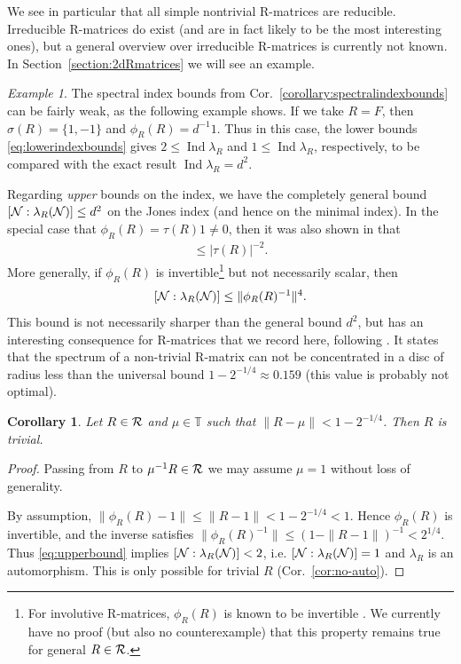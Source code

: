 \documentclass[12pt,a4paper]{amsart}
\numberwithin{equation}{section}
\newtheorem{corollary}[theorem]{Corollary}
\theoremstyle{remark}
\newtheorem{example}[theorem]{Example}
\def\Ind{\operatorname{Ind}}
\def\T{\mathbb{T}}
\newcommand{\la}{\lambda}
\begin{document}
We see in particular that all simple nontrivial R-matrices are reducible. Irreducible R-matrices do exist (and are in fact likely to be the most interesting ones), but a general overview over irreducible R-matrices is currently not known. In Section~\ref{section:2dRmatrices} we will see an example.


\begin{example}
    The spectral index bounds from Cor.~\ref{corollary:spectralindexbounds} can be fairly weak, as the following example shows. If we take $R=F$, then $\sigma(R)=\{1,-1\}$ and $\phi_R(R)=d^{-1}1$. Thus in this case, the lower bounds \eqref{eq:lowerindexbounds} gives $2\leq\Ind\la_R$ and $1\leq\Ind\la_R$, respectively, to be compared with the exact result $\Ind\la_R=d^2$.
\end{example}

Regarding {\em upper} bounds on the index, we have the completely general bound $[\CN:\la_R(\CN)]\leq d^2$ on the Jones index \cite{ContiPinzari:1996} (and hence on the minimal index). In the special case that $\phi_R(R)=\tau(R)1\neq0$, then it was also shown in \cite{ContiPinzari:1996} that
\begin{align}
	[\CN:\la_R(\CN)]\leq |\tau(R)|^{-2}.	
\end{align}
More generally, if $\phi_R(R)$ is invertible\footnote{For involutive R-matrices, $\phi_R(R)$ is known to be invertible \cite{LechnerPennigWood:2019}. We currently have no proof (but also no counterexample) that this property remains true for general $R\in\mathcal{R}$.} but not necessarily scalar, then
\begin{align}\label{eq:upperbound}
    [\CN:\la_R(\CN)]\leq \|\phi_R(R)^{-1}\|^4.
\end{align}
This bound is not necessarily sharper than the general bound $d^2$, but has an interesting consequence for R-matrices that we record here, following \cite[Cor.~5.5]{ContiPinzari:1996}. It states that the spectrum of a non-trivial R-matrix can not be concentrated in a disc of radius less than the universal bound $1-2^{-1/4}\approx0.159$ (this value is probably not optimal). 

\begin{corollary}\label{corollary:no-spectral-concentration}
	Let $R\in\mathcal{R}$ and $\mu\in\T$ such that $\|R-\mu\|<1-2^{-1/4}$. Then $R$ is trivial.
\end{corollary}
\begin{proof}
	Passing from $R$ to $\mu^{-1} R\in\mathcal{R}$ we may assume $\mu=1$ without loss of generality. 
	
	By assumption, $\|\phi_R(R)-1\|\leq\|R-1\|<1-2^{-1/4}<1$. Hence $\phi_R(R)$ is invertible, and the inverse satisfies $\|\phi_R(R)^{-1}\|\leq(1-\|R-1\|)^{-1}<2^{1/4}$. Thus \eqref{eq:upperbound} implies $[\CN:\la_R(\CN)]<2$, i.e. $[\CN:\la_R(\CN)]=1$ and $\la_R$ is an automorphism. This is only possible for trivial $R$ (Cor.~\ref{cor:no-auto}).
\end{proof}
\end{document}
